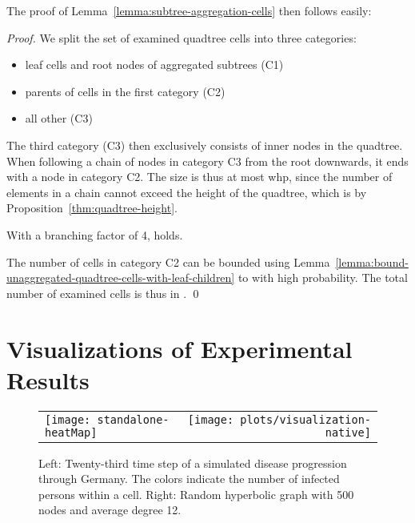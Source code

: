 \documentclass{llncs}
\begin{document}
The proof of Lemma~\ref{lemma:subtree-aggregation-cells} then follows easily:
\begin{proof}
We split the set of examined quadtree cells into three categories:
\begin{itemize}
 \item leaf cells and root nodes of aggregated subtrees (C1)
 \item parents of cells in the first category (C2)
 \item all other (C3)
\end{itemize}
The third category (C3) then exclusively consists of inner nodes in the quadtree. When following a chain of nodes in category C3 from the root downwards, it ends with a node in category C2.
The size  is thus at most  whp, since the number of elements in a chain cannot exceed the height of the quadtree, which is  by Proposition~\ref{thm:quadtree-height}.

With a branching factor of 4,  holds.

The number of cells in category C2 can be bounded using Lemma~\ref{lemma:bound-unaggregated-quadtree-cells-with-leaf-children} to  with high probability.
The total number of examined cells is thus in .
\qed
\end{proof}

\pagebreak

\section{Visualizations of Experimental Results}
\begin{figure}[ht!]
\centering
\begin{tabular}{lr}
\texttt{[image: standalone-heatMap]}
\hspace{0.1cm}
&
\hspace{0.1cm}
\texttt{[image: plots/visualization-native]}
\end{tabular}
 \caption{Left: Twenty-third time step of a simulated disease progression through Germany. 
The colors indicate the number of infected persons within a cell. 
Right: Random hyperbolic graph with 500 nodes and average degree 12.
}
 \label{plot:heatMap-and-hyperbolic-disk}
\end{figure}


\pagebreak
\end{document}
